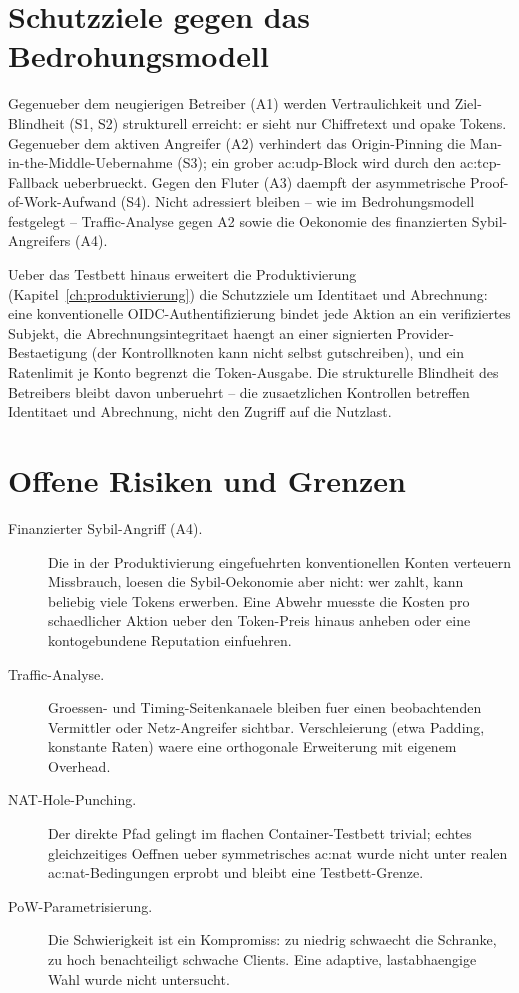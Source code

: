 \section{Schutzziele gegen das Bedrohungsmodell}
\label{sec:disk-schutz}

Gegenueber dem neugierigen Betreiber (A1) werden Vertraulichkeit und
Ziel-Blindheit (S1, S2) strukturell erreicht: er sieht nur Chiffretext und opake
Tokens. Gegenueber dem aktiven Angreifer (A2) verhindert das Origin-Pinning die
Man-in-the-Middle-Uebernahme (S3); ein grober \gls{ac:udp}-Block wird durch den
\gls{ac:tcp}-Fallback ueberbrueckt. Gegen den Fluter (A3) daempft der
asymmetrische Proof-of-Work-Aufwand (S4). Nicht adressiert bleiben -- wie im
Bedrohungsmodell festgelegt -- Traffic-Analyse gegen A2 sowie die Oekonomie des
finanzierten Sybil-Angreifers (A4).

Ueber das Testbett hinaus erweitert die Produktivierung
(Kapitel~\ref{ch:produktivierung}) die Schutzziele um Identitaet und
Abrechnung: eine konventionelle OIDC-Authentifizierung bindet jede Aktion an
ein verifiziertes Subjekt, die Abrechnungsintegritaet haengt an einer
signierten Provider-Bestaetigung (der Kontrollknoten kann nicht selbst
gutschreiben), und ein Ratenlimit je Konto begrenzt die Token-Ausgabe. Die
strukturelle Blindheit des Betreibers bleibt davon unberuehrt -- die
zusaetzlichen Kontrollen betreffen Identitaet und Abrechnung, nicht den Zugriff
auf die Nutzlast.

\section{Offene Risiken und Grenzen}
\label{sec:disk-risiken}

\begin{description}
  \item[Finanzierter Sybil-Angriff (A4).] Die in der Produktivierung
    eingefuehrten konventionellen Konten verteuern Missbrauch, loesen die
    Sybil-Oekonomie aber nicht: wer zahlt, kann beliebig viele Tokens erwerben.
    Eine Abwehr muesste die Kosten pro schaedlicher Aktion ueber den Token-Preis
    hinaus anheben oder eine kontogebundene Reputation einfuehren.
  \item[Traffic-Analyse.] Groessen- und Timing-Seitenkanaele bleiben fuer einen
    beobachtenden Vermittler oder Netz-Angreifer sichtbar. Verschleierung (etwa
    Padding, konstante Raten) waere eine orthogonale Erweiterung mit eigenem
    Overhead.
  \item[NAT-Hole-Punching.] Der direkte Pfad gelingt im flachen Container-Testbett
    trivial; echtes gleichzeitiges Oeffnen ueber symmetrisches \gls{ac:nat} wurde
    nicht unter realen \gls{ac:nat}-Bedingungen erprobt und bleibt eine
    Testbett-Grenze.
  \item[PoW-Parametrisierung.] Die Schwierigkeit ist ein Kompromiss: zu niedrig
    schwaecht die Schranke, zu hoch benachteiligt schwache Clients. Eine
    adaptive, lastabhaengige Wahl wurde nicht untersucht.
\end{description}

